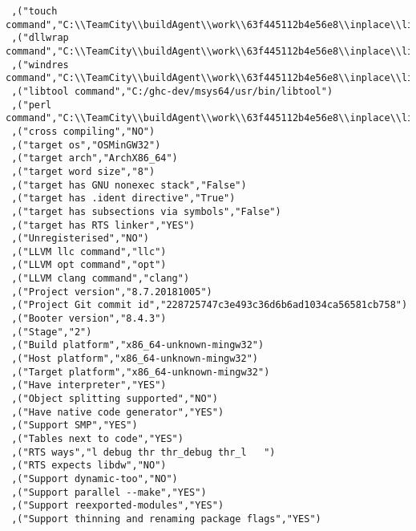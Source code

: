 \begin{verbatim}
 ,("touch command","C:\\TeamCity\\buildAgent\\work\\63f445112b4e56e8\\inplace\\lib/bin/touchy.exe")
 ,("dllwrap command","C:\\TeamCity\\buildAgent\\work\\63f445112b4e56e8\\inplace\\lib\\../mingw/bin/dllwrap.exe")
 ,("windres command","C:\\TeamCity\\buildAgent\\work\\63f445112b4e56e8\\inplace\\lib\\../mingw/bin/windres.exe")
 ,("libtool command","C:/ghc-dev/msys64/usr/bin/libtool")
 ,("perl command","C:\\TeamCity\\buildAgent\\work\\63f445112b4e56e8\\inplace\\lib\\../perl/perl.exe")
 ,("cross compiling","NO")
 ,("target os","OSMinGW32")
 ,("target arch","ArchX86_64")
 ,("target word size","8")
 ,("target has GNU nonexec stack","False")
 ,("target has .ident directive","True")
 ,("target has subsections via symbols","False")
 ,("target has RTS linker","YES")
 ,("Unregisterised","NO")
 ,("LLVM llc command","llc")
 ,("LLVM opt command","opt")
 ,("LLVM clang command","clang")
 ,("Project version","8.7.20181005")
 ,("Project Git commit id","228725747c3e493c36d6b6ad1034ca56581cb758")
 ,("Booter version","8.4.3")
 ,("Stage","2")
 ,("Build platform","x86_64-unknown-mingw32")
 ,("Host platform","x86_64-unknown-mingw32")
 ,("Target platform","x86_64-unknown-mingw32")
 ,("Have interpreter","YES")
 ,("Object splitting supported","NO")
 ,("Have native code generator","YES")
 ,("Support SMP","YES")
 ,("Tables next to code","YES")
 ,("RTS ways","l debug thr thr_debug thr_l   ")
 ,("RTS expects libdw","NO")
 ,("Support dynamic-too","NO")
 ,("Support parallel --make","YES")
 ,("Support reexported-modules","YES")
 ,("Support thinning and renaming package flags","YES")

\end{verbatim}
